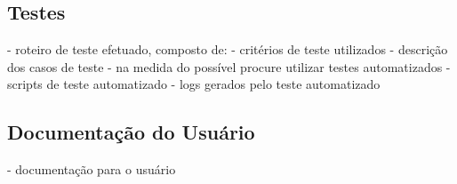 \documentclass{acm_proc_article-sp}
\numberwithin{equation}{section}
\begin{document}
\subsection{Testes}
      - roteiro de teste efetuado, composto de:
                  - critérios de teste utilizados
                  - descrição dos casos de teste
                  - na medida do possível procure utilizar testes automatizados
                  - scripts de teste automatizado
                  - logs gerados pelo teste automatizado

\subsection{Documentação do Usuário}
      - documentação para o usuário 




\end{document}
